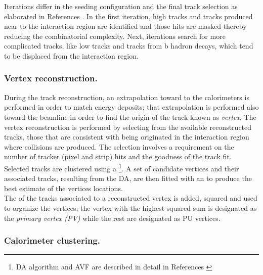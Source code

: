 \noindent Iterations differ in the seeding configuration and the final track selection as elaborated in References \cite{particle_flow, particle_flow2}. In the first iteration, high \pt tracks and tracks produced near to the interaction region are identified and those hits are masked thereby reducing the combinatorial complexity. Next, iterations search for more complicated tracks, like low \pt tracks and tracks from b hadron decays, which tend to be displaced from the interaction region.

\subsubsection*{Vertex reconstruction.}

\noindent During the track reconstruction, an extrapolation toward to the calorimeters is performed in order to match energy deposits; that extrapolation is performed also toward the beamline in order to find the origin of the track known as \textit{vertex}. The vertex reconstruction is performed by selecting from the available reconstructed tracks, those that are consistent with being originated in the interaction region where \pp collisions are produced. The selection involves a requirement on the number of tracker (pixel and strip) hits and the goodness of the track fit.\\

\noindent Selected tracks are clustered using a \footnote{DA algorithm and AVF are described in detail in References \cite{da, avf}}. A set of candidate vertices and their associated tracks, resulting from the DA, are then fitted with an  to produce the best estimate of the vertices locations.\\

\noindent The \pt of the tracks associated to a reconstructed vertex is added, squared and used to organize the vertices; the vertex with the highest squared sum is designated as the \textit{primary vertex (PV)} while the rest are designated as PU vertices. 

\subsubsection*{Calorimeter clustering.}

